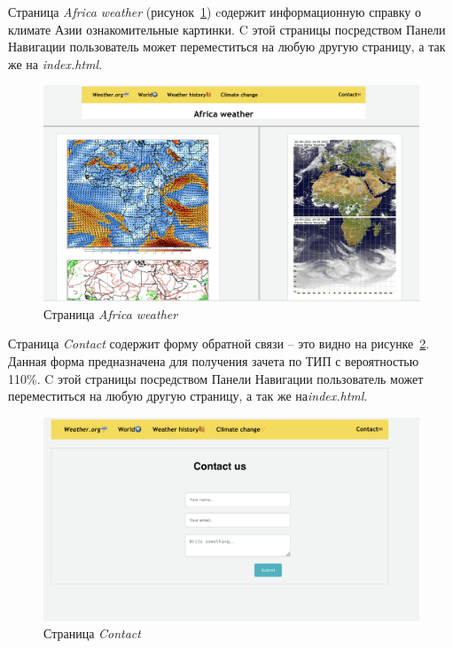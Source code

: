 \documentclass[a4paper,hidelinks,14pt]{extarticle}
\begin{document}
Страница \textit{Africa weather} (рисунок~\ref{fig:fig9}) cодержит информационную справку о климате Азии ознакомительные картинки. C этой страницы посредством Панели Навигации пользователь может переместиться на любую другую страницу, а так же на\textit{ index.html}.

\begin{figure}[htbp]
    \centering
    \includegraphics[scale=0.4]{fig/w_africa.png}
    \caption{Страница \textit{Africa weather}}
    \label{fig:fig9}
\end{figure}

\clearpage
Страница \textit{Contact} содержит форму обратной связи -- это видно на рисунке~\ref{fig:fig10}. Данная форма предназначена для получения зачета по ТИП с вероятностью 110\%. C этой страницы посредством Панели Навигации пользователь может переместиться на любую другую страницу, а так же на\textit{index.html}.

\begin{figure}[htbp]
    \centering
    \includegraphics[scale=0.4]{fig/contact.png}
    \caption{Страница \textit{Contact}}
    \label{fig:fig10}
\end{figure}
\end{document}
